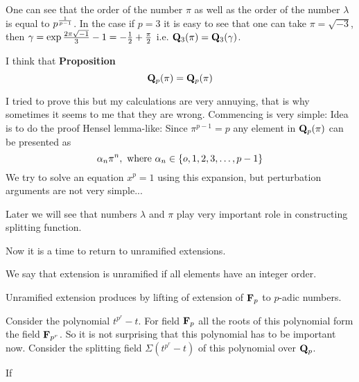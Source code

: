 \documentclass[12pt]{article}
\theoremstyle{theorem}
\numberwithin{equation}{section}
\begin{document}
  One can see that the order of the number $\pi$ as well as the order of the number $\lambda$ is equal to
  $p^{1\over p-1}$. In the case if $p=3$ it is easy to see that one can take $\pi=\sqrt {-3}$, then
  $\gamma=\exp{2\pi\sqrt{-1}\over 3}-1=-{1\over 2}+{\pi\over 2}$ i.e. ${\bf Q}_3(\pi)={\bf Q}_3(\gamma)$.

\medskip
I think that
{\bf Proposition}
\begin{equation}\label{proposition1}
{\bf Q}_p(\pi)={\bf Q}_p(\pi)
\end{equation}

I tried to prove this but my calculations are very annuying, that is why sometimes it seems to me that they are wrong.
Commencing is very simple: Idea is to do the proof Hensel lemma-like:
Since $\pi^{p-1}=p$ any element in ${\bf Q}_p(\pi)$ can be presented as
               $$
               \alpha_n\pi^n,\,\, \hbox{where $\alpha_n\in \{o,1,2,3,\dots, p-1\}$}
               $$
We try to solve an equation $x^p=1$ using this expansion, but perturbation arguments are not very simple...


\medskip

Later we will see that numbers $\lambda$ and $\pi$ play very important role in constructing splitting function.

Now it is a time to return to unramified extensions.



We say that extension is unramified if all elements have an integer order.

Unramified extension produces by lifting of extension of ${\bf F}_p$ to $p$-adic numbers.


Consider the polynomial $t^{p^r}-t$. For field ${\bf F}_p$ all the roots of this polynomial form the
field ${\bf F}_{p^r}$. So it is not surprising that this polynomial has to be important now.
Consider the splitting field $\Sigma(t^{p^r}-t)$ of this polynomial over ${\bf Q}_p$.

If
\end{document}
